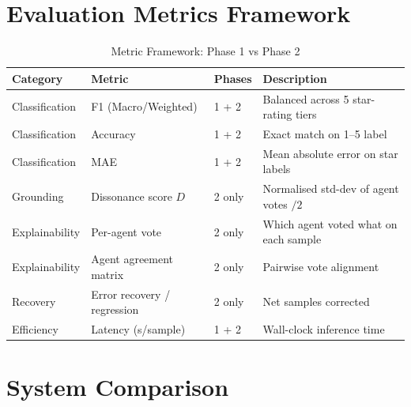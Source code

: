 \documentclass[12pt,a4paper]{article}
\begin{document}
\section{Evaluation Metrics Framework}

\begin{table}[H]
\centering
\caption{Metric Framework: Phase 1 vs Phase 2}
\begin{tabular}{lllp{5.5cm}}
\toprule
\textbf{Category} & \textbf{Metric} & \textbf{Phases} & \textbf{Description} \\
\midrule
Classification & F1 (Macro/Weighted) & 1 + 2 & Balanced across 5 star-rating tiers \\
Classification & Accuracy            & 1 + 2 & Exact match on 1--5 label \\
Classification & MAE                 & 1 + 2 & Mean absolute error on star labels \\
Grounding      & Dissonance score $D$ & 2 only & Normalised std-dev of agent votes $/2$ \\
Explainability & Per-agent vote      & 2 only & Which agent voted what on each sample \\
Explainability & Agent agreement matrix & 2 only & Pairwise vote alignment \\
Recovery       & Error recovery / regression & 2 only & Net samples corrected \\
Efficiency     & Latency (s/sample)  & 1 + 2 & Wall-clock inference time \\
\bottomrule
\end{tabular}
\end{table}

\section{System Comparison}
\end{document}
